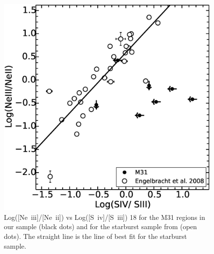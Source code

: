 \begin{figure}
\centering
\includegraphics[scale=0.3]{./NevsS.eps}
\caption{ Log([Ne~{\sc iii}]/[Ne~{\sc ii}])  vs Log([S~{\sc iv}]/[S~{\sc iii}]) 18 for the M31 regions in our sample (black dots) and for the starburst sample from \citet{Engelbracht_2008} (open dots). The straight line is the line of best fit for the starburst sample.}
\label{SvsNe}
\end{figure}

